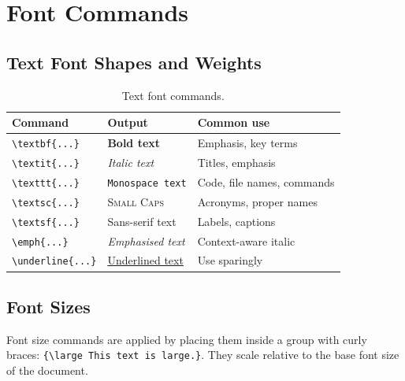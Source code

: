 \newpage
\section{Font Commands}

\subsection{Text Font Shapes and Weights}
\begin{table}[H]
	\centering
	\caption{Text font commands.}
	\label{tab:fonts-text}
	\begin{tabular}{@{}lll@{}}
		\toprule
		Command & Output & Common use \\
		\midrule
		\texttt{\textbackslash textbf\{...\}}    & \textbf{Bold text}          & Emphasis, key terms \\
		\texttt{\textbackslash textit\{...\}}    & \textit{Italic text}        & Titles, emphasis \\
		\texttt{\textbackslash texttt\{...\}}    & \texttt{Monospace text}     & Code, file names, commands \\
		\texttt{\textbackslash textsc\{...\}}    & \textsc{Small Caps}         & Acronyms, proper names \\
		\texttt{\textbackslash textsf\{...\}}    & \textsf{Sans-serif text}    & Labels, captions \\
		\texttt{\textbackslash emph\{...\}}      & \emph{Emphasised text}      & Context-aware italic \\
		\texttt{\textbackslash underline\{...\}} & \underline{Underlined text} & Use sparingly \\
		\bottomrule
	\end{tabular}
\end{table}

\subsection{Font Sizes}
Font size commands are applied by placing them inside a group with curly braces: \texttt{\{\textbackslash large This text is large.\}}. They scale relative to the base font size of the document.

